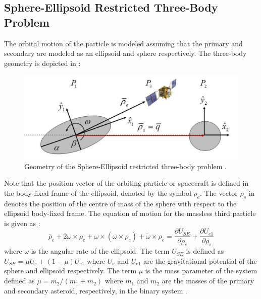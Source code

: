 \subsection{Sphere-Ellipsoid Restricted Three-Body Problem}
\label{SERTBP}
The orbital motion of the particle is modeled assuming that the primary and secondary are modeled as an ellipsoid and sphere respectively. The three-body geometry is depicted in  \cite{chappaz}:
\begin{figure}[h]
\centering
\captionsetup{justification=centering}
\includegraphics[scale=0.8]{sertbp.png}
\caption{Geometry of the Sphere-Ellipsoid restricted three-body problem \cite{chappaz}.}
\label{fig:sertbp}
\end{figure}
\FloatBarrier
%
Note that the position vector of the orbiting particle or spacecraft is defined in the body-fixed frame of the ellipsoid, denoted by the symbol $\rho_e$. The vector $\rho_s$ in  denotes the position of the centre of mass of the sphere with respect to the ellipsoid body-fixed frame. The equation of motion for the massless third particle is given as \cite{chappaz}:
\begin{equation}
\label{sertbp_eom}
\ddot{\rho_e} + 2\omega \times \dot{\rho_e} + \omega \times (\omega \times \rho_e) + \dot{\omega} \times \rho_e = \frac{\partial U_{SE}}{\partial \rho_e} + \frac{\partial U_{e1}}{\partial \rho_s}
\end{equation}
%
where $\omega$ is the angular rate of the ellipsoid. The term $U_{SE}$ is defined as $U_{SE} = \mu U_s + (1-\mu)U_{e1}$ where $U_s$ and $U_{e1}$ are the gravitational potential of the sphere and ellipsoid respectively. The term $\mu$ is the mass parameter of the system defined as $\mu = m_2/(m_1 + m_2)$ where $m_1$ and $m_2$ are the masses of the primary and secondary asteroid,  respectively, in the binary system \cite{chappaz}.

